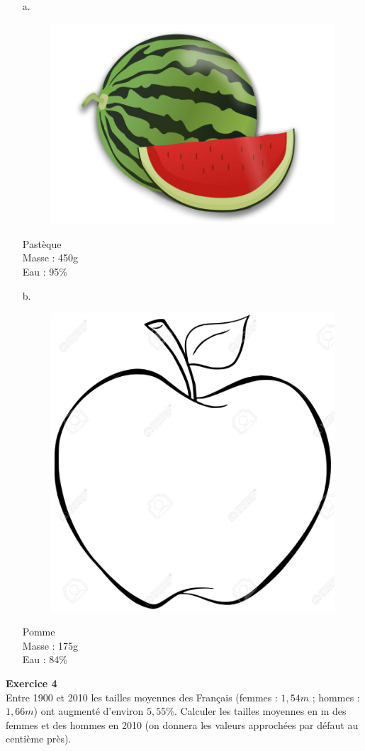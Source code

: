 \documentclass[12pt]{article}
\newcommand{\Pointille}[1][3]{\multido{}{#1}{    \makebox[\linewidth]{\dotfill}\\[\parskip]}}
\begin{document}
\begin{multicols}{2}
  \begin{enumerate}
  \item[a.] 
    \begin{figure}[H]
      \centering
      \includegraphics[width=0.3\linewidth]{sources/2/pasteque.jpg}
    \end{figure}
    Pastèque\\
    Masse : 450g\\
    Eau : 95\%\\
    \Pointille[3]

  \item [b.]
    \begin{figure}[H]
      \centering
      \includegraphics[width=0.2\linewidth]{sources/2/pomme.jpg}
    \end{figure}
    Pomme\\
    Masse : 175g\\
    Eau : 84\%\\
    \Pointille[3]
  \end{enumerate}
\end{multicols}


\begin{multicols}{2}
  \textbf{Exercice 4}\\
  Entre 1900 et 2010 les tailles moyennes des Français (femmes : $1,54m$ ; hommes : $1,66m$) ont augmenté d'environ $5,55\%$. Calculer les tailles moyennes en m des femmes et des hommes en 2010 (on donnera les valeurs approchées par défaut au centième près).\\

  \Pointille[6]

\end{multicols}
\end{document}
